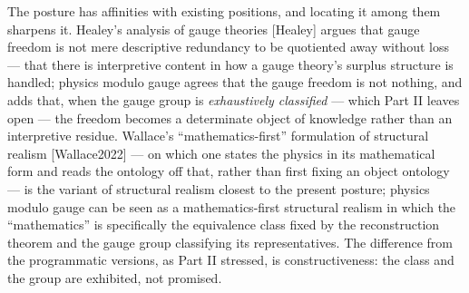 \documentclass[
]{article}
\begin{document}
The posture has affinities with existing positions, and locating it
among them sharpens it. Healey's analysis of gauge theories {[}Healey{]}
argues that gauge freedom is not mere descriptive redundancy to be
quotiented away without loss --- that there is interpretive content in
how a gauge theory's surplus structure is handled; physics modulo gauge
agrees that the gauge freedom is not nothing, and adds that, when the
gauge group is \emph{exhaustively classified} --- which Part II leaves
open --- the freedom becomes a determinate object of knowledge rather
than an interpretive residue. Wallace's ``mathematics-first''
formulation of structural realism {[}Wallace2022{]} --- on which one
states the physics in its mathematical form and reads the ontology off
that, rather than first fixing an object ontology --- is the variant of
structural realism closest to the present posture; physics modulo gauge
can be seen as a mathematics-first structural realism in which the
``mathematics'' is specifically the equivalence class fixed by the
reconstruction theorem and the gauge group classifying its
representatives. The difference from the programmatic versions, as Part
II stressed, is constructiveness: the class and the group are exhibited,
not promised.
\end{document}
